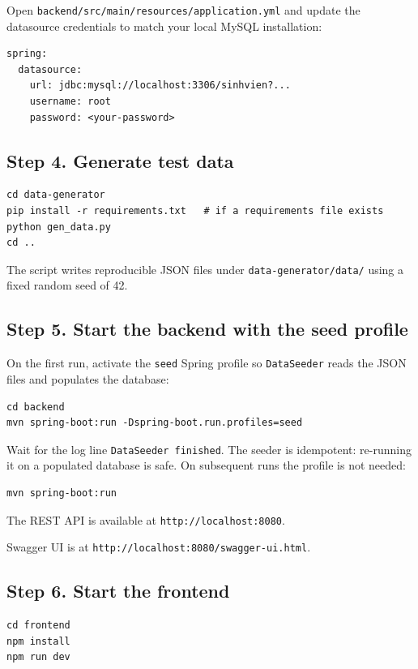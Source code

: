 \documentclass[12pt,a4paper]{report}
\begin{document}
Open \texttt{backend/src/main/resources/application.yml} and update the datasource credentials to match your local MySQL installation:

\begin{verbatim}
spring:
  datasource:
    url: jdbc:mysql://localhost:3306/sinhvien?...
    username: root
    password: <your-password>
\end{verbatim}

\subsection*{Step 4. Generate test data}

\begin{verbatim}
cd data-generator
pip install -r requirements.txt   # if a requirements file exists
python gen_data.py
cd ..
\end{verbatim}

The script writes reproducible JSON files under \texttt{data-generator/data/} using a fixed random seed of 42.

\subsection*{Step 5. Start the backend with the seed profile}

On the first run, activate the \texttt{seed} Spring profile so \texttt{DataSeeder} reads the JSON files and populates the database:

\begin{verbatim}
cd backend
mvn spring-boot:run -Dspring-boot.run.profiles=seed
\end{verbatim}

Wait for the log line \texttt{DataSeeder finished}. The seeder is idempotent: re-running it on a populated database is safe. On subsequent runs the profile is not needed:

\begin{verbatim}
mvn spring-boot:run
\end{verbatim}

The REST API is available at \texttt{http://localhost:8080}. 

Swagger UI is at \texttt{http://localhost:8080/swagger-ui.html}.

\subsection*{Step 6. Start the frontend}

\begin{verbatim}
cd frontend
npm install
npm run dev
\end{verbatim}
\end{document}
